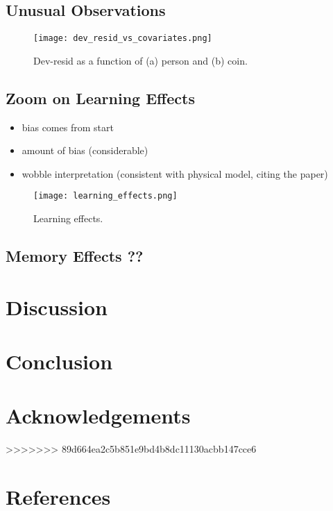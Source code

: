 \documentclass[a4paper, 12pt,oneside]{article}
\begin{document}
		\subsection{Unusual Observations}
		\begin{figure}[htb]
			\centering
			\texttt{[image: dev\_resid\_vs\_covariates.png]}
			\caption{Dev-resid as a function of (a) person and (b) coin.}
			\label{fig:dev-resid-vs-covariates}
		\end{figure}

		\subsection{Zoom on Learning Effects}
		\begin{itemize}
			\item bias comes from start
			\item amount of bias (considerable)
			\item wobble interpretation (consistent with physical model, citing the paper)
		\end{itemize}
		\lipsum[1]
		\begin{figure}[htb]
			\centering
			\texttt{[image: learning\_effects.png]}
			\caption{Learning effects.}
			\label{fig:learning-effects}
		\end{figure}
		\subsection{Memory Effects ??}

	\section{Discussion}
	\section{Conclusion}
	\section*{Acknowledgements}
>>>>>>> 89d664ea2c5b851e9bd4b8dc11130acbb147cce6
	\section*{References}
\end{document}
